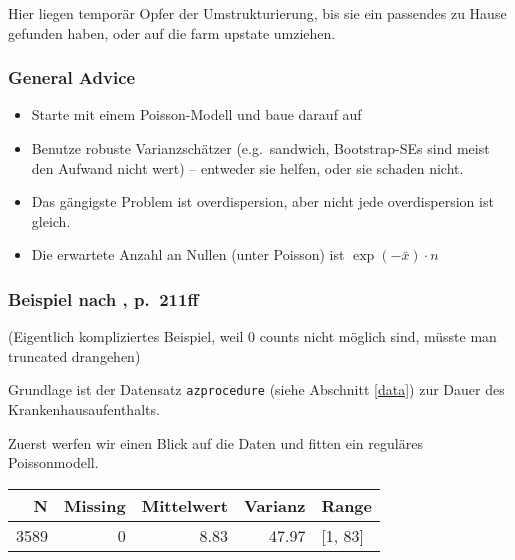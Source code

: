 \documentclass[ngerman,a4paper,]{scrartcl}
\newenvironment{Shaded}{\begin{snugshade}}{\end{snugshade}}
\newcommand{\DataTypeTok}[1]{\textcolor[rgb]{0.13,0.29,0.53}{#1}}
\newcommand{\KeywordTok}[1]{\textcolor[rgb]{0.13,0.29,0.53}{\textbf{#1}}}
\newcommand{\NormalTok}[1]{#1}
\newcommand{\OperatorTok}[1]{\textcolor[rgb]{0.81,0.36,0.00}{\textbf{#1}}}
\newcommand{\StringTok}[1]{\textcolor[rgb]{0.31,0.60,0.02}{#1}}
\providecommand{\tightlist}{%
  \setlength{\itemsep}{0pt}\setlength{\parskip}{0pt}}
\theoremstyle{definition}
\theoremstyle{definition}
\theoremstyle{definition}
\theoremstyle{remark}
\begin{document}
Hier liegen temporär Opfer der Umstrukturierung, bis sie ein passendes zu Hause gefunden haben, oder auf die farm upstate umziehen.

\hypertarget{general-advice}{%
\subsubsection{General Advice}\label{general-advice}}

\begin{itemize}
\tightlist
\item
  Starte mit einem Poisson-Modell und baue darauf auf
\item
  Benutze robuste Varianzschätzer (e.g.~sandwich, Bootstrap-SEs sind meist den Aufwand nicht wert) -- entweder sie helfen, oder sie schaden nicht.
\item
  Das gängigste Problem ist overdispersion, aber nicht jede overdispersion ist gleich.
\item
  Die erwartete Anzahl an Nullen (unter Poisson) ist \(\exp(-\bar{x}) \cdot n\)
\end{itemize}

\hypertarget{beispiel-nach-hilbemodelingcountdata2014-p.211ff}{%
\subsubsection{\texorpdfstring{Beispiel nach \citet{hilbeModelingCountData2014}, p.~211ff}{Beispiel nach @hilbeModelingCountData2014, p.~211ff}}\label{beispiel-nach-hilbemodelingcountdata2014-p.211ff}}

(Eigentlich kompliziertes Beispiel, weil 0 counts nicht möglich sind, müsste man truncated drangehen)

Grundlage ist der Datensatz \texttt{azprocedure} (siehe Abschnitt \ref{data}) zur Dauer des Krankenhausaufenthalts.

Zuerst werfen wir einen Blick auf die Daten und fitten ein reguläres Poissonmodell.

\begin{Shaded}
\end{Shaded}

\begin{table}[H]
\centering
\begin{tabular}{rrrrl}
\toprule
N & Missing & Mittelwert & Varianz & Range\\
\midrule
3589 & 0 & 8.83 & 47.97 & [1, 83]\\
\bottomrule
\end{tabular}
\end{table}
\end{document}
